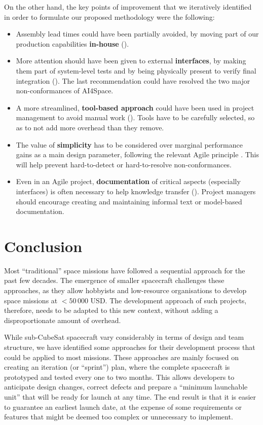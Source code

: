 \documentclass[journal,10pt]{IEEEtran}
\begin{document}
On the other hand, the key points of improvement that we iteratively identified in order to formulate our proposed methodology were the following:
\begin{itemize}
	\item Assembly lead times could have been partially avoided, by moving part of our production capabilities \textbf{in-house} ().
	\item More attention should have been given to external \textbf{interfaces}, by making them part of system-level tests and by being physically present to verify final integration (). The last recommendation could have resolved the two major non-conformances of AI4Space.
	\item A more streamlined, \textbf{tool-based approach} could have been used in project management to avoid manual work (). Tools have to be carefully selected, so as to not add more overhead than they remove.
	\item The value of \textbf{simplicity} has to be considered over marginal performance gains as a main design parameter, following the relevant Agile principle \autocite{beckAgileManifesto2001}. This will help prevent hard-to-detect or hard-to-resolve non-conformances.
	\item Even in an Agile project, \textbf{documentation} of critical aspects (especially interfaces) is often necessary to help knowledge transfer (). Project managers should encourage creating and maintaining informal text or model-based documentation. 
\end{itemize}


\section{Conclusion}
Most ``traditional'' space missions have followed a sequential approach for the past few decades. The emergence of smaller spacecraft challenges these approaches, as they allow hobbyists and low-resource organisations to develop space missions at \( <50\,000\) USD. The development approach of such projects, therefore, needs to be adapted to this new context, without adding a disproportionate amount of overhead.

While sub-CubeSat spacecraft vary considerably in terms of design and team structure, we have identified some approaches for their development process that could be applied to most missions. These approaches are mainly focused on creating an iteration (or ``sprint'') plan, where the complete spacecraft is prototyped and tested every one to two months. This allows developers to anticipate design changes, correct defects and prepare a ``minimum launchable unit'' that will be ready for launch at any time. The end result is that it is easier to guarantee an earliest launch date, at the expense of some requirements or features that might be deemed too complex or unnecessary to implement.
\end{document}
